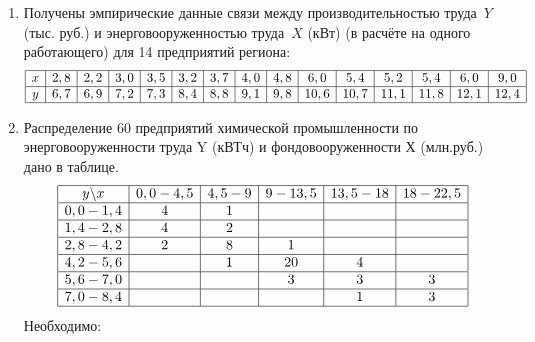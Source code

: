 \documentclass[a4paper,12pt]{extarticle}
\begin{document}
\begin{enumerate}
  \item Получены эмпирические данные связи между производительностью труда~$Y$ (тыс. руб.) и энерговооруженностью труда~$X$ (кВт) (в расчёте на одного работающего) для 14 предприятий региона:
  \[
    \begin{array}{|c|c|c|c|c|c|c|c|c|c|c|c|c|c|c|}
      \hline
      x & 2,8 & 2,2 & 3,0 & 3,5 & 3,2 & 3,7 & 4,0 & 
        4,8 & 6,0 & 5,4 & 5,2 & 5,4 & 6,0 & 9,0 \\
      \hline
      y & 6,7 & 6,9 & 7,2 & 7,3 & 8,4 & 8,8 & 9,1 &
        9,8 & 10,6 & 10,7 & 11,1 & 11,8 & 12,1 & 12,4 \\
      \hline
    \end{array}
  \]
 
  
  \item
    Распределение 60 предприятий химической промышленности по энерговооруженности труда Y (кВТч) и фондовооруженности Х (млн.руб.) дано в таблице.
    \[
    \begin{array}{|c|c|c|c|c|c|}
      \hline
       y \backslash x & 0,0-4,5 & 4,5-9 & 9-13,5 & 13,5-18 & 18-22,5 \\
      \hline
      0,0-1,4 & 4 & 1 &  &  & \\
      \hline
      1,4-2,8 & 4 & 2 &  &  & \\
      \hline
      2,8-4,2 & 2 & 8 & 1 &  & \\
      \hline
      4,2-5,6 &  & 1 & 20 & 4 & \\
      \hline
      5,6-7,0 &  &  & 3 & 3 & 3 \\
      \hline
      7,0-8,4 &  &  &   & 1 & 3 \\
      \hline
    \end{array}
    \]
    Необходимо: 


\end{enumerate}
\end{document}
